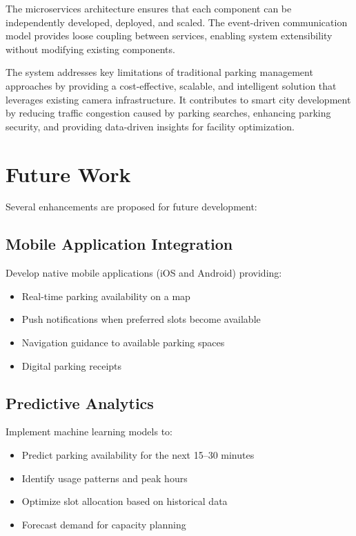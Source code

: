 \documentclass[12pt,a4paper]{report}
\begin{document}
The microservices architecture ensures that each component can be independently developed, deployed, and scaled. The event-driven communication model provides loose coupling between services, enabling system extensibility without modifying existing components.

The system addresses key limitations of traditional parking management approaches by providing a cost-effective, scalable, and intelligent solution that leverages existing camera infrastructure. It contributes to smart city development by reducing traffic congestion caused by parking searches, enhancing parking security, and providing data-driven insights for facility optimization.

\section{Future Work}

Several enhancements are proposed for future development:

\subsection{Mobile Application Integration}
Develop native mobile applications (iOS and Android) providing:
\begin{itemize}
    \item Real-time parking availability on a map
    \item Push notifications when preferred slots become available
    \item Navigation guidance to available parking spaces
    \item Digital parking receipts
\end{itemize}

\subsection{Predictive Analytics}
Implement machine learning models to:
\begin{itemize}
    \item Predict parking availability for the next 15--30 minutes
    \item Identify usage patterns and peak hours
    \item Optimize slot allocation based on historical data
    \item Forecast demand for capacity planning
\end{itemize}
\end{document}
